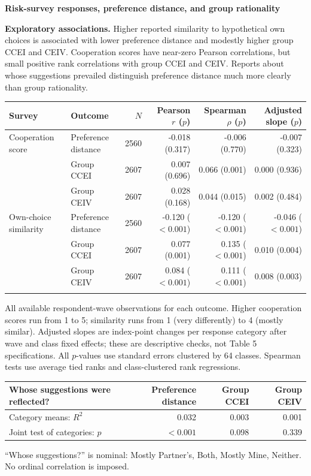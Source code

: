 \documentclass[11pt]{article}
\begin{document}
\begin{center}\Large\textbf{Risk-survey responses, preference distance, and group rationality}\end{center}
\textbf{Exploratory associations.} Higher reported similarity to hypothetical own choices is associated with lower
preference distance and modestly higher group CCEI and CEIV. Cooperation scores have near-zero Pearson correlations,
but small positive rank correlations with group CCEI and CEIV. Reports about whose suggestions prevailed distinguish
preference distance much more clearly than group rationality.

\begin{center}\small
\begin{tabular}{llrrrr}\toprule
Survey & Outcome & $N$ & Pearson $r$ ($p$) & Spearman $\rho$ ($p$) & Adjusted slope ($p$)\\\midrule
Cooperation score & Preference distance & 2560 & -0.018 (0.317) & -0.006 (0.770) & -0.007 (0.323)\\
 & Group CCEI & 2607 & 0.007 (0.696) & 0.066 (0.001) & 0.000 (0.936)\\
 & Group CEIV & 2607 & 0.028 (0.168) & 0.044 (0.015) & 0.002 (0.484)\\
\addlinespace
Own-choice similarity & Preference distance & 2560 & -0.120 ($<0.001$) & -0.120 ($<0.001$) & -0.046 ($<0.001$)\\
 & Group CCEI & 2607 & 0.077 (0.001) & 0.135 ($<0.001$) & 0.010 (0.004)\\
 & Group CEIV & 2607 & 0.084 ($<0.001$) & 0.111 ($<0.001$) & 0.008 (0.003)\\
\addlinespace
\bottomrule\end{tabular}\end{center}
\small
All available respondent-wave observations for each outcome. Higher cooperation scores run from 1 to 5;
similarity runs from 1 (very differently) to 4 (mostly similar). Adjusted slopes are index-point changes per response category
after wave and class fixed effects; these are descriptive checks, not Table 5 specifications. All $p$-values use standard
errors clustered by 64 classes. Spearman tests use average tied ranks and class-clustered rank regressions.

\begin{center}
\begin{tabular}{lrrr}\toprule
Whose suggestions were reflected? & Preference distance & Group CCEI & Group CEIV\\\midrule
Category means: $R^2$ & 0.032 & 0.003 & 0.001\\
Joint test of categories: $p$ & $<0.001$ & 0.098 & 0.339\\
\bottomrule\end{tabular}\end{center}
``Whose suggestions?'' is nominal: Mostly Partner's, Both, Mostly Mine, Neither. No ordinal correlation is imposed.
\end{document}
